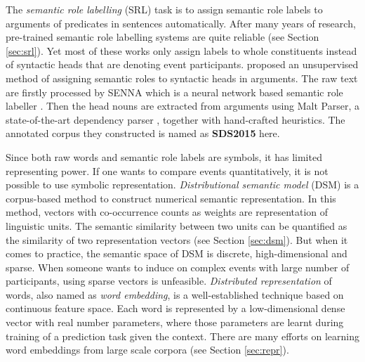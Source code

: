 \documentclass[a4paper]{article}
\begin{document}
The \textit{semantic role labelling} (SRL) task is to assign semantic role labels to arguments of predicates in sentences automatically. After many years of research, pre-trained semantic role labelling systems are quite reliable (see Section \ref{sec:srl}). Yet most of these works only assign labels to whole constituents instead of syntactic heads that are denoting event participants. \citet{SayeedEtAl2015} proposed an unsupervised method of assigning semantic roles to syntactic heads in arguments. The raw text are firstly processed by SENNA which is a neural network based semantic role labeller \citep{collobert2011natural}. Then the head nouns are extracted from arguments using Malt Parser, a state-of-the-art dependency parser \citep{nivre2006maltparser}, together with hand-crafted heuristics. The annotated corpus they constructed is named as \textbf{SDS2015} here. 

Since both raw words and semantic role labels are symbols, it has limited representing power. If one wants to compare events quantitatively, it is not possible to use symbolic representation. \textit{Distributional semantic model} (DSM) is a corpus-based method to construct numerical semantic representation. In this method, vectors with co-occurrence counts as weights are representation of linguistic units. The semantic similarity between two units can be quantified as the similarity of two representation vectors (see Section \ref{sec:dsm}). But when it comes to practice, the semantic space of DSM is discrete, high-dimensional and sparse. When someone wants to induce on complex events with large number of participants, using sparse vectors is unfeasible. \textit{Distributed representation} of words, also named as \textit{word embedding}, is a well-established technique based on continuous feature space. Each word is represented by a low-dimensional dense vector with real number parameters, where those parameters are learnt during training of a prediction task given the context. There are many efforts on learning word embeddings from large scale corpora (see Section \ref{sec:repr}). 
\end{document}

